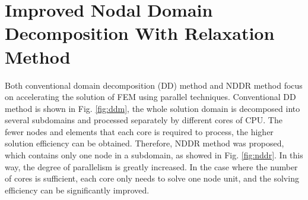 \documentclass[journal,transmag]{IEEEtran}
\begin{document}
\section{Improved Nodal Domain Decomposition With Relaxation Method}
Both conventional domain decomposition (DD) method and NDDR method focus on accelerating the solution of FEM using parallel techniques. Conventional DD method is shown in Fig. \ref{fig:ddm}, the whole solution domain is decomposed into several subdomains and processed separately by different cores of CPU. The fewer nodes and elements that each core is required to process, the higher solution efficiency can be obtained. Therefore, NDDR method was proposed, which contains only one node in a subdomain, as showed in Fig. \ref{fig:nddr}. In this way, the degree of parallelism is greatly increased. In the case where the number of cores is sufficient, each core only needs to solve one node unit, and the solving efficiency can be significantly improved.
\end{document}
